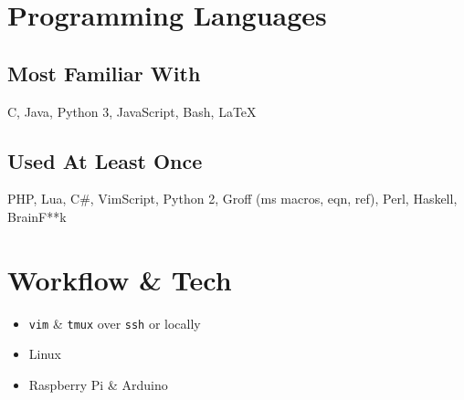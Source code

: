 \documentclass[9pt]{extarticle}
\begin{document}
    \section{Programming Languages}
    \subsection{Most Familiar With}
    C, Java, Python 3, JavaScript, Bash, \LaTeX
    \subsection{Used At Least Once}
    PHP, Lua, C\#, VimScript, Python 2, Groff (ms macros, eqn, ref), Perl, Haskell, BrainF**k
    \section{Workflow \& Tech}
    \begin{itemize}
        \item \texttt{vim} \& \texttt{tmux} over \texttt{ssh} or locally
        \item Linux
        \item Raspberry Pi \& Arduino
    \end{itemize}
\end{document}

